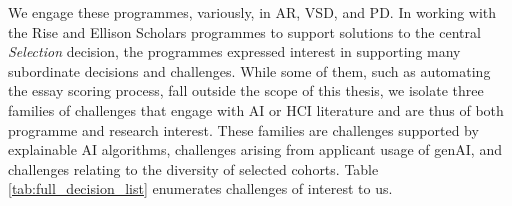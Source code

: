We engage these programmes, variously, in AR, VSD, and PD. In working with the Rise and Ellison Scholars programmes to support solutions to the central \emph{Selection} decision, the programmes expressed interest in supporting many subordinate decisions and challenges. While some of them, such as automating the essay scoring process, fall outside the scope of this thesis, we isolate three families of challenges that engage with AI or HCI literature and are thus of both programme and research interest. These families are challenges supported by explainable AI algorithms, challenges arising from applicant usage of genAI, and challenges relating to the diversity of selected cohorts. Table \ref{tab:full_decision_list} enumerates challenges of interest to us. 